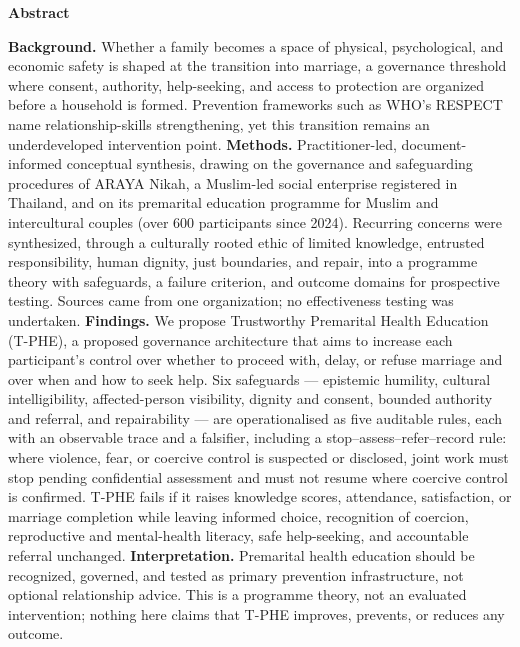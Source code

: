 \documentclass[11pt]{article}
\newcommand{\tphe}{T\mbox{-}PHE}
\begin{document}
\begin{center}
\begin{minipage}{0.94\textwidth}
\small
\noindent\textbf{Abstract}\par\vspace{2pt}
\textbf{Background.} Whether a family becomes a space of physical, psychological, and economic safety is shaped at the transition into marriage, a governance threshold where consent, authority, help-seeking, and access to protection are organized before a household is formed. Prevention frameworks such as WHO's RESPECT name relationship-skills strengthening, yet this transition remains an underdeveloped intervention point.
\textbf{Methods.} Practitioner-led, document-informed conceptual synthesis, drawing on the governance and safeguarding procedures of ARAYA Nikah, a Muslim-led social enterprise registered in Thailand, and on its premarital education programme for Muslim and intercultural couples (over 600 participants since 2024). Recurring concerns were synthesized, through a culturally rooted ethic of limited knowledge, entrusted responsibility, human dignity, just boundaries, and repair, into a programme theory with safeguards, a failure criterion, and outcome domains for prospective testing. Sources came from one organization; no effectiveness testing was undertaken.
\textbf{Findings.} We propose Trustworthy Premarital Health Education (\tphe), a proposed governance architecture that aims to increase each participant's control over whether to proceed with, delay, or refuse marriage and over when and how to seek help. Six safeguards --- epistemic humility, cultural intelligibility, affected-person visibility, dignity and consent, bounded authority and referral, and repairability --- are operationalised as five auditable rules, each with an observable trace and a falsifier, including a stop--assess--refer--record rule: where violence, fear, or coercive control is suspected or disclosed, joint work must stop pending confidential assessment and must not resume where coercive control is confirmed. \tphe{} fails if it raises knowledge scores, attendance, satisfaction, or marriage completion while leaving informed choice, recognition of coercion, reproductive and mental-health literacy, safe help-seeking, and accountable referral unchanged.
\textbf{Interpretation.} Premarital health education should be recognized, governed, and tested as primary prevention infrastructure, not optional relationship advice. This is a programme theory, not an evaluated intervention; nothing here claims that \tphe{} improves, prevents, or reduces any outcome.
\end{minipage}
\end{center}
\vspace{3mm}
\end{document}
